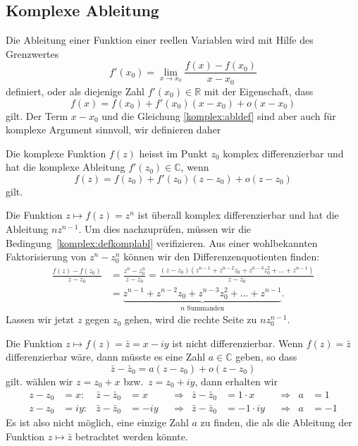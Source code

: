 %
%
\subsection{Komplexe Ableitung}
Die Ableitung einer Funktion einer reellen Variablen wird mit Hilfe des
Grenzwertes
\[
f'(x_0)=\lim_{x\to x_0}\frac{f(x)-f(x_0)}{x-x_0}
\]
definiert, oder als diejenige Zahl $f'(x_0)\in\mathbb R$ mit der Eigenschaft,
dass
\begin{equation}
f(x)=f(x_0)+f'(x_0)(x-x_0) + o(x-x_0)
\label{komplex:abldef}
\end{equation}
gilt.
Der Term $x-x_0$ und die Gleichung \eqref{komplex:abldef} sind aber auch
für komplexe Argument sinnvoll, wir definieren daher

\begin{definition}
Die komplexe Funktion $f(z)$ heisst im Punkt $z_0$ komplex differenzierbar
und hat die komplexe Ableitung $f'(z_0)\in\mathbb C$, wenn
%
%
%
\begin{equation}
f(z)=f(z_0) + f'(z_0)(z-z_0) +o(z-z_0)
\label{komplex:defkomplabl}
\end{equation}
gilt.
\end{definition}

\begin{beispiel}
Die Funktion $z\mapsto f(z)=z^n$ ist überall komplex differenzierbar
und hat die Ableitung $nz^{n-1}$.
Um dies nachzuprüfen, müssen wir die Bedingung~\eqref{komplex:defkomplabl}
verifizieren.
Aus einer wohlbekannten Faktorisierung von $z^n - z_0^n$ können wir den
Differenzenquotienten finden:
\begin{align*}
\frac{f(z)-f(z_0)}{z-z_0}
&=
\frac{z^n-z_0^n}{z-z_0}
=
\frac{(z-z_0)(z^{n-1}+z^{n-2}z_0+z^{n-3}z_0^2+\dots+z^{n-1})}{z-z_0}
\\
&=
\underbrace{z^{n-1}+z^{n-2}z_0+z^{n-3}z_0^2+\dots+z^{n-1}
}_{\displaystyle \text{$n$ Summanden}}.
\end{align*}
Lassen wir jetzt $z$ gegen $z_0$ gehen, wird die rechte Seite
zu $nz_0^{n-1}$.
\end{beispiel}

\begin{beispiel}
Die Funktion $z\mapsto f(z)=\bar z=x-iy$ ist nicht differenzierbar.
Wenn $f(z)=\bar z$ differenzierbar wäre, dann müsste es eine Zahl
$a\in\mathbb C$ geben, so dass
\[
\bar z-\bar z_0=a(z-z_0)+o(z-z_0)
\]
gilt.
wählen wir $z=z_0+x$ bzw.~$z=z_0+iy$, dann erhalten wir
\[
\begin{aligned}
z-z_0&=x:&
\bar z-\bar z_0&=x
&&\Rightarrow&
\bar z-\bar z_0&=1\cdot x
&&\Rightarrow&
a&=1
\\
z-z_0&=iy:&
\bar z-\bar z_0&=-iy
&&\Rightarrow&
\bar z-\bar z_0&=-1\cdot iy
&&\Rightarrow&
a&=-1
\end{aligned}
\]
Es ist also nicht möglich, eine einzige Zahl $a$ zu finden, die als
die Ableitung der Funktion $z\mapsto \bar z$ betrachtet werden könnte.
\end{beispiel}

